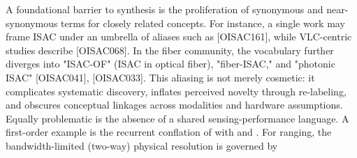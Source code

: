 {} A foundational barrier to synthesis is the proliferation of synonymous and near-synonymous terms for closely related concepts. For instance, a single work may frame ISAC under an umbrella of aliases such as  [O\markdownRendererUnderscore{}ISAC\markdownRendererUnderscore{}161], while VLC-centric studies describe  [O\markdownRendererUnderscore{}ISAC\markdownRendererUnderscore{}068]. In the fiber community, the vocabulary further diverges into "ISAC-OF" (ISAC in optical fiber), "fiber-ISAC," and "photonic ISAC" [O\markdownRendererUnderscore{}ISAC\markdownRendererUnderscore{}041], [O\markdownRendererUnderscore{}ISAC\markdownRendererUnderscore{}033]. This aliasing is not merely cosmetic: it complicates systematic discovery, inflates perceived novelty through re-labeling, and obscures conceptual linkages across modalities and hardware assumptions.\markdownRendererParagraphSeparator
{} Equally problematic is the absence of a shared sensing-performance language. A first-order example is the recurrent conflation of  with  and . For ranging, the bandwidth-limited (two-way) physical resolution is governed by\markdownRendererSoftLineBreak
{}\markdownRendererSoftLineBreak
